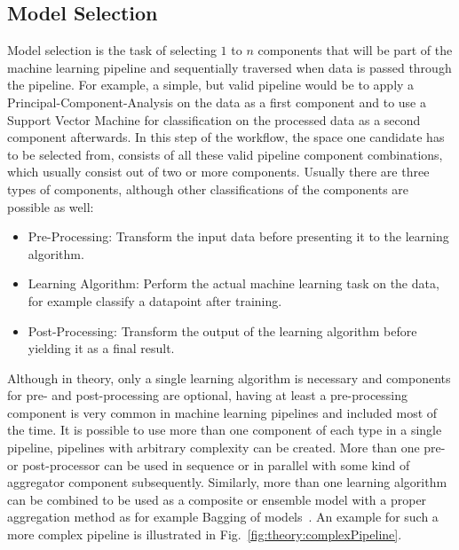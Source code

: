 \subsection{Model Selection}
\label{sec:theory:automl:selection}
Model selection is the task of selecting $1$ to $n$ components that will be part of the machine learning pipeline and sequentially traversed when data is passed through the pipeline.
For example, a simple, but valid pipeline would be to apply a Principal-Component-Analysis on the data as a first component and to use a Support Vector Machine for classification on the processed data as a second component afterwards.
In this step of the workflow, the space one candidate has to be selected from, consists of all these valid pipeline component combinations, which usually consist out of two or more components.\newline
Usually there are three types of components, although other classifications of the components are possible as well:
\begin{itemize}
    \item Pre-Processing: Transform the input data before presenting it to the learning algorithm.
    \item Learning Algorithm: Perform the actual machine learning task on the data, for example classify a datapoint after training.
    \item Post-Processing: Transform the output of the learning algorithm before yielding it as a final result.
\end{itemize}
Although in theory, only a single learning algorithm is necessary and components for pre- and post-processing are optional, having at least a pre-processing component is very common in machine learning pipelines and included most of the time.\newline
It is possible to use more than one component of each type in a single pipeline, pipelines with arbitrary complexity can be created.
More than one pre- or post-processor can be used in sequence or in parallel with some kind of aggregator component subsequently.
Similarly, more than one learning algorithm can be combined to be used as a composite or ensemble model with a proper aggregation method as for example Bagging of models~\cite{Breiman-BaggingPredictors}.
An example for such a more complex pipeline is illustrated in Fig.~\ref{fig:theory:complexPipeline}.
